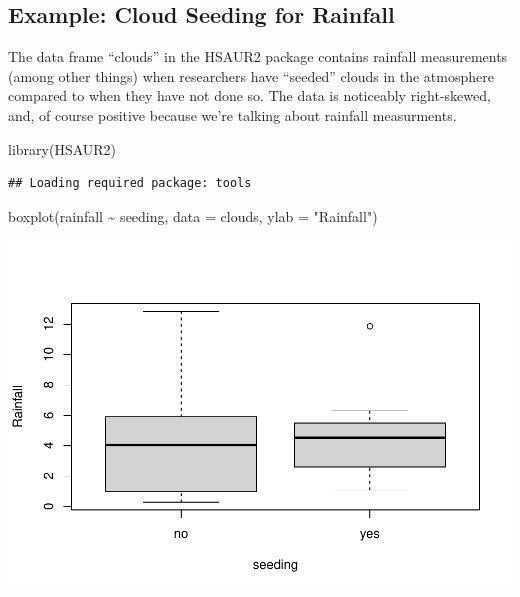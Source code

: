 \documentclass[
]{book}
\newenvironment{Shaded}{\begin{snugshade}}{\end{snugshade}}
\newcommand{\AttributeTok}[1]{\textcolor[rgb]{0.77,0.63,0.00}{#1}}
\newcommand{\FunctionTok}[1]{\textcolor[rgb]{0.00,0.00,0.00}{#1}}
\newcommand{\NormalTok}[1]{#1}
\newcommand{\SpecialCharTok}[1]{\textcolor[rgb]{0.00,0.00,0.00}{#1}}
\newcommand{\StringTok}[1]{\textcolor[rgb]{0.31,0.60,0.02}{#1}}
\begin{document}
\hypertarget{example-cloud-seeding-for-rainfall}{%
\subsection{Example: Cloud Seeding for Rainfall}\label{example-cloud-seeding-for-rainfall}}

The data frame ``clouds'' in the HSAUR2 package contains rainfall measurements (among other things) when researchers have ``seeded'' clouds in the atmosphere compared to when they have not done so. The data is noticeably right-skewed, and, of course positive because we're talking about rainfall measurments.

\begin{Shaded}
\begin{Highlighting}[]
\FunctionTok{library}\NormalTok{(HSAUR2)}
\end{Highlighting}
\end{Shaded}

\begin{verbatim}
## Loading required package: tools
\end{verbatim}

\begin{Shaded}
\begin{Highlighting}[]
\FunctionTok{boxplot}\NormalTok{(rainfall }\SpecialCharTok{\textasciitilde{}}\NormalTok{ seeding, }\AttributeTok{data =}\NormalTok{ clouds, }\AttributeTok{ylab =} \StringTok{"Rainfall"}\NormalTok{)}
\end{Highlighting}
\end{Shaded}

\includegraphics{04-Non-Normal-Responses_files/figure-latex/unnamed-chunk-2-1.pdf}
\end{document}
